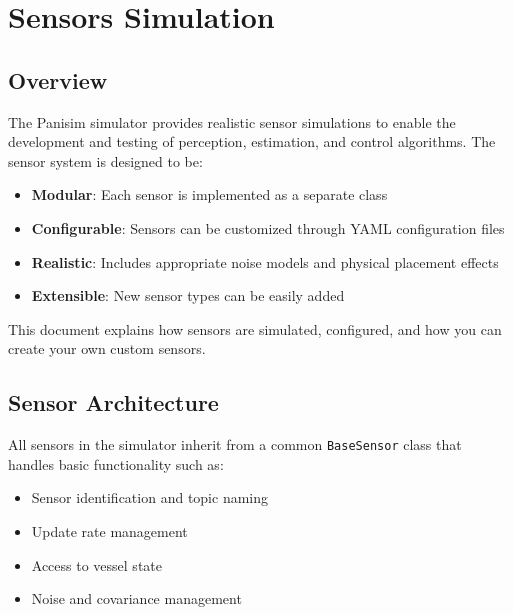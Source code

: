 \documentclass[
  letterpaper,
  DIV=11,
  numbers=noendperiod]{scrreprt}
\providecommand{\tightlist}{%
  \setlength{\itemsep}{0pt}\setlength{\parskip}{0pt}}\usepackage{longtable,booktabs,array}
\begin{document}

\chapter*{Sensors Simulation}\label{sensors-simulation}


\section*{Overview}\label{overview-3}


The Panisim simulator provides realistic sensor simulations to enable
the development and testing of perception, estimation, and control
algorithms. The sensor system is designed to be:

\begin{itemize}
\tightlist
\item
  \textbf{Modular}: Each sensor is implemented as a separate class
\item
  \textbf{Configurable}: Sensors can be customized through YAML
  configuration files
\item
  \textbf{Realistic}: Includes appropriate noise models and physical
  placement effects
\item
  \textbf{Extensible}: New sensor types can be easily added
\end{itemize}

This document explains how sensors are simulated, configured, and how
you can create your own custom sensors.

\section*{Sensor Architecture}\label{sensor-architecture}


All sensors in the simulator inherit from a common \texttt{BaseSensor}
class that handles basic functionality such as:

\begin{itemize}
\tightlist
\item
  Sensor identification and topic naming
\item
  Update rate management
\item
  Access to vessel state
\item
  Noise and covariance management
\end{itemize}
\end{document}

